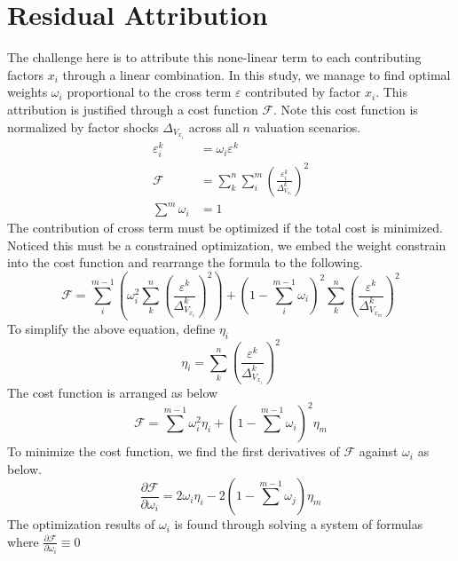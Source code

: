 \documentclass{article}
\begin{document}
\section{Residual Attribution}
The challenge here is to attribute this none-linear term to each contributing factors $ x_i $ through a linear combination. In this study, we manage to find optimal weights $ \omega_i $ proportional to the cross term $ \varepsilon $ contributed by factor $ x_i $. This attribution is justified through a cost function $ \mathcal{F} $. Note this cost function is normalized by factor shocks $ \Delta_{V_{x_i}} $ across all $ n $ valuation scenarios.
\begin{subequations}
    \begin{align}
        \varepsilon_i^k &= \omega_i \varepsilon^k \\
        \mathcal{F} &= \sum_{k}^{n}{\sum_{i}^{m}\left(\frac{\varepsilon_i^k}{\Delta_{V_{x_i}}^k}\right)^2} \\
        \sum^m{\omega_i} &= 1
    \end{align}
\end{subequations}
The contribution of cross term must be optimized if the total cost is minimized. Noticed this must be a constrained optimization, we embed the weight constrain into the cost function and rearrange the formula to the following.
\begin{equation}
    \mathcal{F} = \sum_{i}^{m-1}{\left(\omega_i^2 \sum_{k}^n{\left(\frac{\varepsilon^k}{\Delta_{V_{x_i}}^k}\right)^2}\right)} + \left(1 - \sum_{i}^{m-1}{\omega_i} \right)^2 \sum_{k}^n{\left(\frac{\varepsilon^k}{\Delta_{V_{x_m}}^k}\right)^2}
\end{equation}
To simplify the above equation, define $ \eta_i $
\begin{equation}
    \eta_i = \sum_{k}^{n}{\left(\frac{\varepsilon^{k}}{\Delta_{V_{x_i}}^{k}}\right)^2}
\end{equation}
The cost function is arranged as below
\begin{equation}
    \mathcal{F} = \sum^{m - 1}{\omega_i^2 \eta_i} + \left(1 - \sum^{m - 1}{\omega_i}\right)^2 \eta_m
\end{equation}
To minimize the cost function, we find the first derivatives of $ \mathcal{F} $ against $ \omega_i $ as below.
\begin{equation}
    \frac{\partial \mathcal{F}}{\partial \omega_i} = 2 \omega_i \eta_i - 2 \left(1 - \sum^{m - 1}{\omega_j}\right)\eta_m
\end{equation}
The optimization results of $ \omega_i $ is found through solving a system of formulas where $ \frac{\partial \mathcal{F}}{\partial \omega_i} \equiv 0 $
\end{document}
